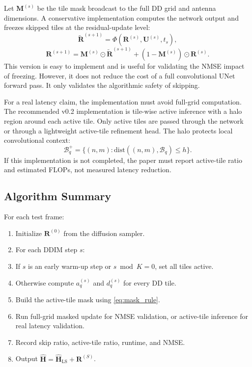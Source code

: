 \documentclass[10pt,journal]{IEEEtran}
\newcommand{\mat}[1]{\mathbf{#1}}
\begin{document}
Let $\mat{M}^{(s)}$ be the tile mask broadcast to the full DD grid and antenna
dimensions. A conservative implementation computes the network output and
freezes skipped tiles at the residual-update level:
\begin{equation}
  \tilde{\mat{R}}^{(s+1)}
  =
  \Phi\left(\mat{R}^{(s)}, \mat{U}^{(s)}, t_s\right),
  \label{eq:candidate_update}
\end{equation}
\begin{equation}
  \mat{R}^{(s+1)}
  =
  \mat{M}^{(s)}\odot\tilde{\mat{R}}^{(s+1)}
  +
  \left(1-\mat{M}^{(s)}\right)\odot\mat{R}^{(s)}.
  \label{eq:masked_update}
\end{equation}
This version is easy to implement and is useful for validating the NMSE impact
of freezing. However, it does not reduce the cost of a full convolutional UNet
forward pass. It only validates the algorithmic safety of skipping.

For a real latency claim, the implementation must avoid full-grid computation.
The recommended v0.2 implementation is tile-wise active inference with a halo
region around each active tile. Only active tiles are passed through the network
or through a lightweight active-tile refinement head. The halo protects local
convolutional context:
\begin{equation}
  \mathcal{B}_q^{+} =
  \{(n,m): \mathrm{dist}((n,m),\mathcal{B}_q)\le h\}.
  \label{eq:halo}
\end{equation}
If this implementation is not completed, the paper must report active-tile
ratio and estimated FLOPs, not measured latency reduction.

\subsection{Algorithm Summary}

For each test frame:
\begin{enumerate}
  \item Initialize $\mat{R}^{(0)}$ from the diffusion sampler.
  \item For each DDIM step $s$:
  \item If $s$ is an early warm-up step or $s\bmod K=0$, set all tiles active.
  \item Otherwise compute $a_q^{(s)}$ and $d_q^{(s)}$ for every DD tile.
  \item Build the active-tile mask using \eqref{eq:mask_rule}.
  \item Run full-grid masked update for NMSE validation, or active-tile
  inference for real latency validation.
  \item Record skip ratio, active-tile ratio, runtime, and NMSE.
  \item Output $\hat{\mat{H}}=\hat{\mat{H}}_{\mathrm{LS}}+\mat{R}^{(S)}$.
\end{enumerate}
\end{document}

